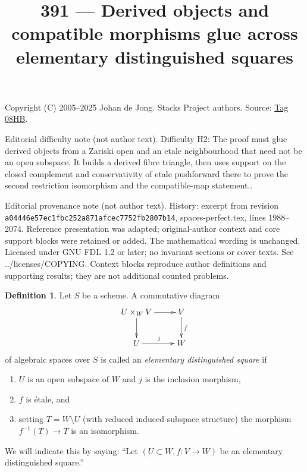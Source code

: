 \documentclass{amsart}
\theoremstyle{plain}
\theoremstyle{definition}
\newtheorem{definition}[subsection]{Definition}
\theoremstyle{remark}
\numberwithin{equation}{subsection}
\begin{document}
\title[Stacks Project, Tag 08HB]{391 --- Derived objects and compatible morphisms glue across elementary distinguished squares}
\maketitle
\noindent Copyright (C) 2005--2025 Johan de Jong. Stacks Project authors. Source: \href{https://stacks.math.columbia.edu/tag/08HB}{Tag 08HB}.

\noindent Editorial difficulty note (not author text). Difficulty H2: The proof must glue derived objects from a Zariski open and an etale neighbourhood that need not be an open subspace. It builds a derived fibre triangle, then uses support on the closed complement and conservativity of etale pushforward there to prove the second restriction isomorphism and the compatible-map statement..

\noindent Editorial provenance note (not author text). History: excerpt from revision \texttt{a0444\allowbreak 6e57e\allowbreak c1fbc\allowbreak 252a8\allowbreak 71afc\allowbreak ec775\allowbreak 2fb28\allowbreak 07b14}, spaces-perfect.tex, lines 1988--2074. Reference presentation was adapted; original-author context and core support blocks were retained or added. The mathematical wording is unchanged. Licensed under GNU FDL 1.2 or later; no invariant sections or cover texts. See ../licenses/COPYING. Context blocks reproduce author definitions and supporting results; they are not additional counted problems.

\begin{definition}
\label{definition-elementary-distinguished-square}
Let $S$ be a scheme. A commutative diagram
$$
\xymatrix{
U \times_W V \ar[r] \ar[d] & V \ar[d]^f \\
U \ar[r]^j & W
}
$$
of algebraic spaces over $S$ is called an {\it elementary distinguished square}
if
\begin{enumerate}
\item $U$ is an open subspace of $W$ and $j$ is the inclusion morphism,
\item $f$ is \'etale, and
\item setting $T = W \setminus U$ (with reduced induced
subspace structure) the morphism $f^{-1}(T) \to T$ is an isomorphism.
\end{enumerate}
We will indicate this by saying: ``Let $(U \subset W, f : V \to W)$
be an elementary distinguished square.''
\end{definition}
\end{document}
